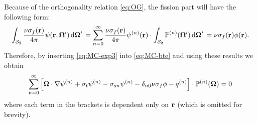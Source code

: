 Because of the orthogonality relation \eqref{eq:OG}, the fission part will have the following form:
\begin{equation}%
  \intA[']{\frac{\nu\sigma_f(\br)}{4\pi}\psi(\br,\bomega')} = 
    \suma[n]{0}{\infty}
    \frac{\nu\sigma_f(\br)}{4\pi}\fmom(\br)\contr\intA[']{\PP(\bomega')} = \nu\sigma_f(\br)\phi(\br).
\end{equation}
Therefore, by inserting \eqref{eq:MC-exp3} into \eqref{eq:MC-bte} and using these results we obtain
\begin{equation}\label{eq:MC-bte2}
  \suma[n]{0}{\infty}\left[\bomega\cdot\nabla\fmom + \sigma_t\fmom 
  - \sigma_{sn}\fmom[n] - \kron{n}{0}\nu\sigma_f\phi - \qmom\right]\contr\PP(\bomega) = 0
\end{equation}
where each term in the brackets is dependent only on $\br$ (which is omitted for brevity).

